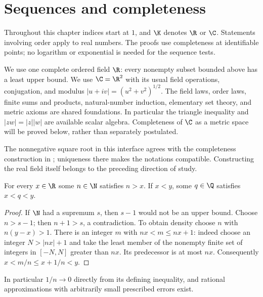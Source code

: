 \chapter{Sequences and completeness}
Throughout this chapter indices start at $1$, and $\K$ denotes $\R$ or $\C$. Statements involving order apply to real numbers. The proofs use completeness at identifiable points; no logarithm or exponential is needed for the sequence tests.

\begin{definition}
We use one complete ordered field $\R$: every nonempty subset bounded above has a least upper bound. We use $\C=\R^2$ with its usual field operations, conjugation, and modulus $|u+iv|=(u^2+v^2)^{1/2}$. The field laws, order laws, finite sums and products, natural-number induction, elementary set theory, and metric axioms are shared foundations. In particular the triangle inequality and $|zw|=|z||w|$ are available scalar algebra. Completeness of $\C$ as a metric space will be proved below, rather than separately postulated.
\end{definition}
The nonnegative square root in this interface agrees with the completeness construction in ; uniqueness there makes the notations compatible. Constructing the real field itself belongs to the preceding direction of study.

\begin{theorem}
For every $x\in\R$ some $n\in\N$ satisfies $n>x$. If $x<y$, some $q\in\Q$ satisfies $x<q<y$.
\end{theorem}
\begin{proof}
If $\N$ had a supremum $s$, then $s-1$ would not be an upper bound. Choose $n>s-1$; then $n+1>s$, a contradiction. To obtain density choose $n$ with $n(y-x)>1$. There is an integer $m$ with $nx<m\le nx+1$: indeed choose an integer $N>|nx|+1$ and take the least member of the nonempty finite set of integers in $[-N,N]$ greater than $nx$. Its predecessor is at most $nx$. Consequently $x<m/n\le x+1/n<y$.
\end{proof}
In particular $1/n\to0$ directly from its defining inequality, and rational approximations with arbitrarily small prescribed errors exist.

